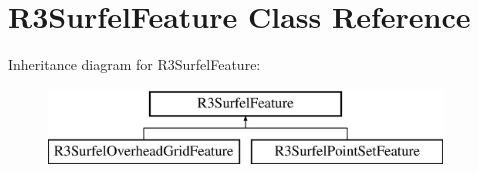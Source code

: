 \hypertarget{class_r3_surfel_feature}{}\section{R3\+Surfel\+Feature Class Reference}
\label{class_r3_surfel_feature}
Inheritance diagram for R3\+Surfel\+Feature\+:\begin{figure}[H]
\begin{center}
\leavevmode
\includegraphics[height=2.000000cm]{class_r3_surfel_feature}
\end{center}
\end{figure}
